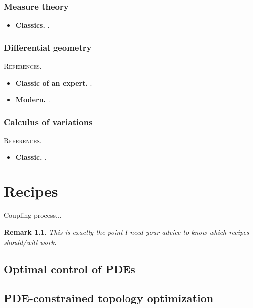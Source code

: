 \documentclass{book}
\numberwithin{equation}{section}
\newtheorem{remark}{Remark}[section]
\begin{document}
\subsection{Measure theory}
\begin{itemize}
    \item \textbf{Classics.} \cite{Evans_Gariepy2015}.
\end{itemize}

\subsection{Differential geometry}
\textsc{References.}
\begin{itemize}
    \item \textbf{Classic of an expert.} \cite{Carmo2016}.
    \item \textbf{Modern.} \cite{Kuhnel2015}.
\end{itemize}

\subsection{Calculus of variations}
\textsc{References.}
\begin{itemize}
    \item \textbf{Classic.} \cite[Chap. 8: The Calculus of Variations]{Evans2010}.
\end{itemize}


\chapter{Recipes}

Coupling process$\ldots$

\begin{remark}
    This is exactly the point I need your advice to know which recipes should/will work.
\end{remark}

\section{Optimal control of PDEs}

\section{PDE-constrained topology optimization}
\end{document}
